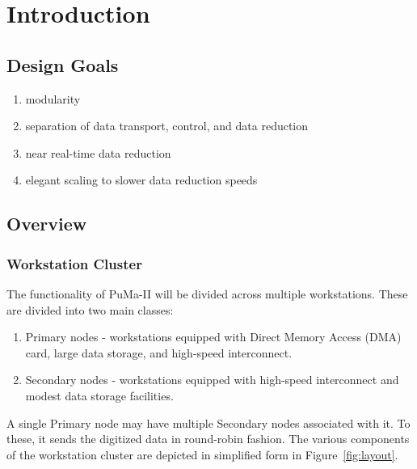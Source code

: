 
\chapter{Introduction}

\section{Design Goals}

\begin{enumerate}
\item modularity
\vspace{-2mm}
\item separation of data transport, control, and data reduction
\vspace{-2mm}
\item near real-time data reduction
\vspace{-2mm}
\item elegant scaling to slower data reduction speeds
\end{enumerate}

\section{Overview}

\subsection{Workstation Cluster}

The functionality of PuMa-II will be divided across multiple workstations.
These are divided into two main classes:

\begin{enumerate}

\item Primary nodes - workstations equipped with Direct Memory Access 
	(DMA) card, large data storage, and high-speed interconnect.

\item Secondary nodes - workstations equipped with high-speed interconnect
	and modest data storage facilities.

\end{enumerate}

A single Primary node may have multiple Secondary nodes associated
with it.  To these, it sends the digitized data in round-robin
fashion.  The various components of the workstation cluster are
depicted in simplified form in Figure~\ref{fig:layout}.

